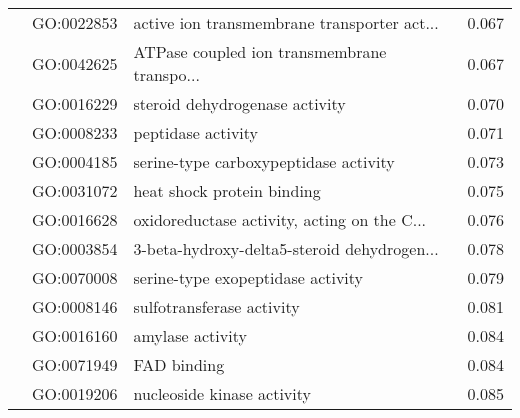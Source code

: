 \begin{longtable}{lllr}
   & GO:0022853 &  active ion transmembrane transporter act... &         0.067 \\
   & GO:0042625 &  ATPase coupled ion transmembrane transpo... &         0.067 \\
   & GO:0016229 &               steroid dehydrogenase activity &         0.070 \\
   & GO:0008233 &                           peptidase activity &         0.071 \\
   & GO:0004185 &        serine-type carboxypeptidase activity &         0.073 \\
   & GO:0031072 &                   heat shock protein binding &         0.075 \\
   & GO:0016628 &  oxidoreductase activity, acting on the C... &         0.076 \\
   & GO:0003854 &  3-beta-hydroxy-delta5-steroid dehydrogen... &         0.078 \\
   & GO:0070008 &            serine-type exopeptidase activity &         0.079 \\
   & GO:0008146 &                    sulfotransferase activity &         0.081 \\
   & GO:0016160 &                             amylase activity &         0.084 \\
   & GO:0071949 &                                  FAD binding &         0.084 \\
   & GO:0019206 &                   nucleoside kinase activity &         0.085 \\
\end{longtable}
